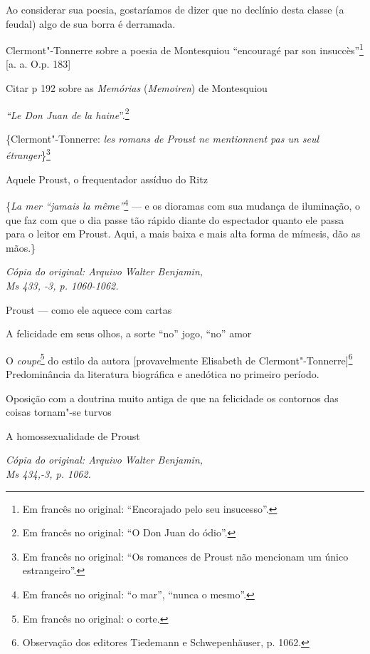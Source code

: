 Ao considerar sua poesia, gostaríamos de dizer que no declínio desta
classe (a feudal) algo de sua borra é derramada.

Clermont"-Tonnerre sobre a poesia de Montesquiou ``encouragé par son
insuccès''\footnote{Em francês no original: ``Encorajado pelo seu insucesso''. \versal{[N. T.]}} {[}a. a. O.p. 183{]}

Citar p 192 sobre as \emph{Memórias} (\emph{Memoiren}) de Montesquiou

\emph{``Le Don Juan de la haine}''.\footnote{Em francês no original: ``O Don Juan do ódio''. \versal{[N. T.]}}

\{Clermont"-Tonnerre: \emph{les romans de Proust ne mentionnent pas un
seul étranger}\}\footnote{Em francês no original: ``Os romances
  de Proust não mencionam um único estrangeiro''. \versal{[N. T.]}}

Aquele Proust, o frequentador assíduo do Ritz

\{\emph{La mer ``jamais la même''}\footnote{Em francês no original: ``o mar'', ``nunca o mesmo''. \versal{[N. T.]}} --- e os dioramas com sua
mudança de iluminação, o que faz com que o dia passe tão rápido diante
do espectador quanto ele passa para o leitor em Proust. Aqui, a mais
baixa e mais alta forma de mímesis, dão as mãos.\}


\begin{flushright}
\emph{\footnotesize{Cópia do original: Arquivo Walter Benjamin,\\ Ms 433, -3, p. 1060-1062.}}
\end{flushright}

Proust --- como ele aquece com cartas

A felicidade em seus olhos, a sorte ``no'' jogo, ``no'' amor

O \emph{coupe}\footnote{Em francês no original: o corte. \versal{[N. T.]}} do
estilo da autora {[}provavelmente Elisabeth de Clermont"-Tonnerre{]}\footnote{Observação dos editores Tiedemann e
  Schwepenhäuser, p. 1062. \versal{[N. E.]}} Predominância da literatura biográfica e
anedótica no primeiro período.

Oposição com a doutrina muito antiga de que na felicidade os contornos
das coisas tornam"-se turvos

A homossexualidade de Proust

\begin{flushright}
\emph{\footnotesize{Cópia do original: Arquivo Walter Benjamin,\\ Ms 434,-3, p. 1062.}}
\end{flushright}

